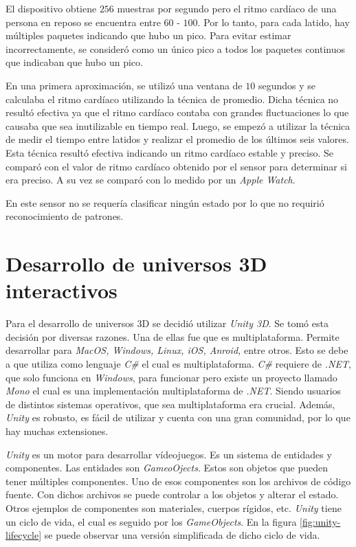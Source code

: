 El dispositivo obtiene $256$ muestras por segundo pero el ritmo cardíaco de una persona en reposo se encuentra entre $ 60$ - $100$. Por lo tanto, para cada latido, hay múltiples paquetes indicando que hubo un pico. Para evitar estimar incorrectamente, se consideró como un único pico a todos los paquetes continuos que indicaban que hubo un pico.

En una primera aproximación, se utilizó una ventana de $10$ segundos y se calculaba el ritmo cardíaco utilizando la técnica de promedio. Dicha técnica no resultó efectiva ya que el ritmo cardíaco contaba con grandes fluctuaciones lo que causaba que sea inutilizable en tiempo real. Luego, se empezó a utilizar la técnica de medir el tiempo entre latidos y realizar el promedio de los últimos seis valores. Esta técnica resultó efectiva indicando un ritmo cardíaco estable y preciso. Se comparó con el valor de ritmo cardíaco obtenido por el sensor para determinar si era preciso. A su vez se comparó con lo medido por un \emph{Apple Watch}.

En este sensor no se requería clasificar ningún estado por lo que no requirió reconocimiento de patrones.

\section{Desarrollo de universos 3D interactivos}

Para el desarrollo de universos 3D se decidió utilizar \emph{Unity 3D}. Se tomó esta decisión por diversas razones. Una de ellas fue que es multiplataforma. Permite desarrollar para \emph{MacOS, Windows, Linux, iOS, Anroid,}  entre otros. Esto se debe a que utiliza como lenguaje \emph{C\#} el cual es multiplataforma. \emph{C\#} requiere de \emph{.NET}, que solo funciona en \emph{Windows}, para funcionar pero existe un proyecto llamado \emph{Mono} el cual es una implementación multiplataforma de \emph{.NET}.  Siendo usuarios de distintos sistemas operativos, que sea multiplataforma era crucial. Además, \emph{Unity} es robusto, es fácil de utilizar y cuenta con una gran comunidad, por lo que hay muchas extensiones.

\emph{Unity} es un motor para desarrollar vídeojuegos. Es un sistema de entidades y componentes. Las entidades son \emph{GameoOjects}. Estos son objetos que pueden tener múltiples componentes. Uno de esos componentes son los archivos de código fuente. Con dichos archivos se puede controlar a los objetos y alterar el estado. Otros ejemplos de componentes son materiales, cuerpos rígidos, etc. \emph{Unity} tiene un ciclo de vida, el cual es seguido por los \emph{GameObjects}. En la figura \ref{fig:unity-lifecycle} se puede observar una versión simplificada de dicho ciclo de vida.

